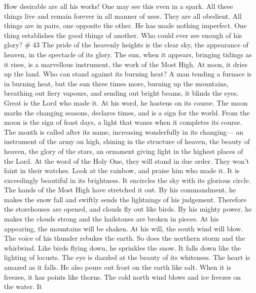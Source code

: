  How desirable are all his works! One may see this even in
a spark.  All these things live and remain forever in all
manner of uses. They are all obedient.  All things are in
pairs, one opposite the other. He has made nothing imperfect.
 One thing establishes the good things of another. Who
could ever see enough of his glory? \# 43  The pride of the
heavenly heights is the clear sky, the appearance of heaven, in the
spectacle of its glory.  The sun, when it appears, bringing
tidings as it rises, is a marvellous instrument, the work of the Most
High.  At noon, it dries up the land. Who can stand against
its burning heat?  A man tending a furnace is in burning
heat, but the sun three times more, burning up the mountains, breathing
out fiery vapours, and sending out bright beams, it blinds the eyes.
 Great is the Lord who made it. At his word, he hastens on
its course.  The moon marks the changing seasons, declares
times, and is a sign for the world.  From the moon is the
sign of feast days, a light that wanes when it completes its course.
 The month is called after its name, increasing wonderfully
in its changing--- an instrument of the army on high, shining in the
structure of heaven,  the beauty of heaven, the glory of the
stars, an ornament giving light in the highest places of the Lord.
 At the word of the Holy One, they will stand in due order.
They won't faint in their watches.  Look at the rainbow,
and praise him who made it. It is exceedingly beautiful in its
brightness.  It encircles the sky with its glorious circle.
The hands of the Most High have stretched it out.  By his
commandment, he makes the snow fall and swiftly sends the lightnings of
his judgement.  Therefore the storehouses are opened, and
clouds fly out like birds.  By his mighty power, he makes
the clouds strong and the hailstones are broken in pieces. 
At his appearing, the mountains will be shaken. At his will, the south
wind will blow.  The voice of his thunder rebukes the
earth. So does the northern storm and the whirlwind. Like birds flying
down, he sprinkles the snow. It falls down like the lighting of locusts.
 The eye is dazzled at the beauty of its whiteness. The
heart is amazed as it falls.  He also pours out frost on
the earth like salt. When it is freezes, it has points like thorns.
 The cold north wind blows and ice freezes on the water. It
